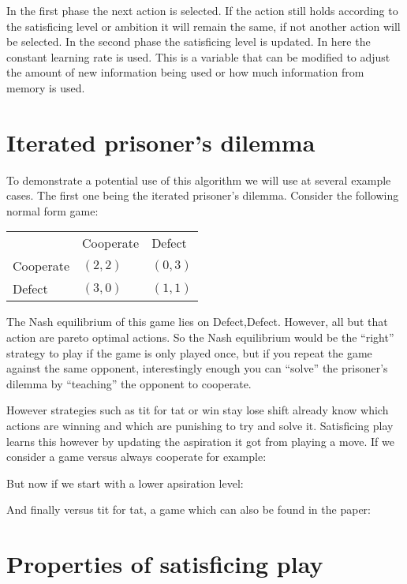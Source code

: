 In the first phase the next action is selected. If the action still holds
according to the satisficing level or ambition it will remain the same, if not another
action will be selected. In the second phase the satisficing level is updated.
In here the constant learning rate is used. This is a variable that can be
modified to adjust the amount of new information being used or how much
information from memory is used.


\section{Iterated prisoner's dilemma}
\drafting
To demonstrate a potential use of this algorithm we will use at several example
cases. The first one being the iterated prisoner's dilemma. Consider
the following normal form game:

\begin{tabular}{lll}
            & Cooperate   & Defect \\
  Cooperate & $(2,2)$     & $(0,3)$  \\
  Defect    & $(3,0)$     & $(1,1)$  \\
\end{tabular}

The Nash equilibrium of this game lies on Defect,Defect. However, all but
that action are pareto optimal actions. So the Nash equilibrium would be the
``right'' strategy to play if the game is only played once, but if you repeat
the game against the same opponent, interestingly enough you can ``solve''
the prisoner's dilemma by ``teaching'' the opponent to cooperate.

However strategies such as tit for tat or win stay lose shift already know
which actions are winning and which are punishing to try and solve it.
Satisficing play learns this however by updating the aspiration it got from
playing a move. If we consider a game versus always cooperate for example:


But now if we start with a lower apsiration level:


And finally versus tit for tat, a game which can also be found in the
\citep{stimpson:2001} paper:

\section{Properties of satisficing play}
\drafting

